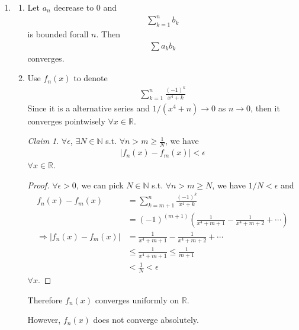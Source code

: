 \documentclass[twoside,11pt]{article}
\newcommand{\R}{\mathbb{R}}
\newcommand{\N}{\mathbb{N}}
\theoremstyle{definition}
\theoremstyle{remark}
\newtheorem*{claim}{Claim}
\begin{document}
\begin{enumerate}
\item \begin{enumerate}
    \item Let $a_n$ decrease to $0$ and 
    \begin{align*}
        \sum_{k=1}^n b_k
    \end{align*}
    is bounded forall $n$.
    Then 
    \begin{align*}
        \sum a_kb_k
    \end{align*}
    converges.
    \item Use $f_n(x)$ to denote
    \begin{align*}
        \sum_{k=1}^n \frac{(-1)^k}{x^4+k}
    \end{align*}
    Since it is a alternative series and $1/(x^4+n)\rightarrow 0$
    as $n\rightarrow 0$, then it converges pointwisely $\forall x\in\R$.

    \begin{claim}
        $\forall\epsilon$, $\exists N\in\N$ s.t. $\forall n>m\geq\frac{1}{N}$,
        we have
        \begin{align*}
            |f_n(x) - f_m(x)| < \epsilon
        \end{align*}
        $\forall x\in\R$.
    \end{claim}
    \begin{proof}
        $\forall\epsilon>0$, we can pick $N\in\N$ s.t.
        $\forall n>m\geq N$, we have $1/N<\epsilon$ and
        \begin{align*}
            f_n(x)-f_m(x) &= \sum_{k=m+1}^n\frac{(-1)^k}{x^4+k}\\
            &= (-1)^(m+1)\left(
                \frac{1}{x^4+m+1} - \frac{1}{x^4+m+2} + \cdots
            \right)\\
            \Rightarrow |f_n(x) - f_m(x)| &= 
            \frac{1}{x^4+m+1} - \frac{1}{x^4+m+2} + \cdots\\
            &\leq \frac{1}{x^4+m+1}\leq \frac{1}{m+1}\\
            &<\frac{1}{N}<\epsilon
        \end{align*}
        $\forall x$.
    \end{proof}
    Therefore $f_n(x)$ converges uniformly on $\R$.

    However, $f_n(x)$ does not converge absolutely.
\end{enumerate}



\end{enumerate}
\end{document}
